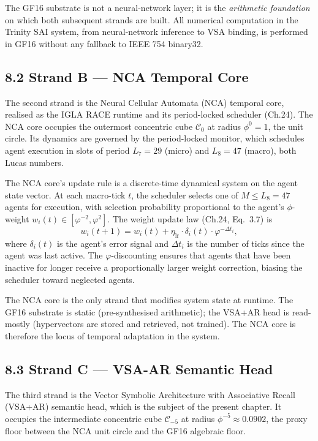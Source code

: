 The GF16 substrate is not a neural-network layer; it is the
\emph{arithmetic foundation} on which both subsequent strands are
built. All numerical computation in the Trinity SAI system, from
neural-network inference to VSA binding, is performed in GF16
without any fallback to IEEE 754 binary32.

\subsection{8.2 Strand B --- NCA Temporal Core}
\label{fa_30:strand-b}

The second strand is the Neural Cellular Automata (NCA) temporal
core, realised as the IGLA RACE runtime and its period-locked
scheduler (Ch.24). The NCA core occupies the outermost concentric
cube $\mathcal{C}_{0}$ at radius $\phi^{0} = 1$, the unit circle.
Its dynamics are governed by the period-locked monitor, which
schedules agent execution in slots of period $L_7 = 29$ (micro) and
$L_8 = 47$ (macro), both Lucas numbers.

The NCA core's update rule is a discrete-time dynamical system on
the agent state vector. At each macro-tick $t$, the scheduler
selects one of $M \leq L_8 = 47$ agents for execution, with
selection probability proportional to the agent's $\phi$-weight
$w_i(t) \in [\varphi^{-2}, \varphi^{2}]$. The weight update law
(Ch.24, Eq.~3.7) is
\[
  w_i(t+1) = w_i(t) + \eta_{\mathrm{lr}} \cdot \delta_i(t) \cdot
    \varphi^{-\Delta t_i},
\]
where $\delta_i(t)$ is the agent's error signal and $\Delta t_i$ is
the number of ticks since the agent was last active. The
$\varphi$-discounting ensures that agents that have been inactive for
longer receive a proportionally larger weight correction, biasing the
scheduler toward neglected agents.

The NCA core is the only strand that modifies system state at
runtime. The GF16 substrate is static (pre-synthesised arithmetic);
the VSA+AR head is read-mostly (hypervectors are stored and
retrieved, not trained). The NCA core is therefore the locus of
temporal adaptation in the system.

\subsection{8.3 Strand C --- VSA-AR Semantic Head}
\label{fa_30:strand-c}

The third strand is the Vector Symbolic Architecture with
Associative Recall (VSA+AR) semantic head, which is the subject of
the present chapter. It occupies the intermediate concentric cube
$\mathcal{C}_{-5}$ at radius $\phi^{-5} \approx 0.0902$, the proxy
floor between the NCA unit circle and the GF16 algebraic floor.


